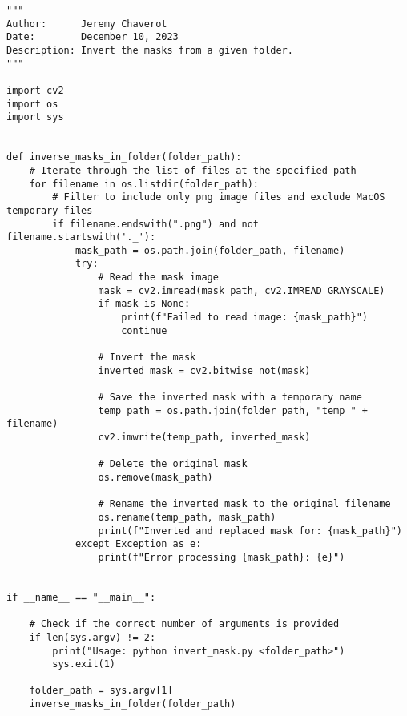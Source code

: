 \begin{lstlisting}[style=pythonstyle, label=lst:4, caption=Python script \texttt{invert\_mask.py} to invert the masks from a specified folder. We aim to have a black object set against a white background.]
"""
Author:      Jeremy Chaverot
Date:        December 10, 2023
Description: Invert the masks from a given folder.
"""

import cv2
import os
import sys


def inverse_masks_in_folder(folder_path):
	# Iterate through the list of files at the specified path
    for filename in os.listdir(folder_path):
    	# Filter to include only png image files and exclude MacOS temporary files
        if filename.endswith(".png") and not filename.startswith('._'):
            mask_path = os.path.join(folder_path, filename)
            try:
                # Read the mask image
                mask = cv2.imread(mask_path, cv2.IMREAD_GRAYSCALE)
                if mask is None:
                    print(f"Failed to read image: {mask_path}")
                    continue

                # Invert the mask
                inverted_mask = cv2.bitwise_not(mask)

                # Save the inverted mask with a temporary name
                temp_path = os.path.join(folder_path, "temp_" + filename)
                cv2.imwrite(temp_path, inverted_mask)

                # Delete the original mask
                os.remove(mask_path)

                # Rename the inverted mask to the original filename
                os.rename(temp_path, mask_path)
                print(f"Inverted and replaced mask for: {mask_path}")
            except Exception as e:
                print(f"Error processing {mask_path}: {e}")


if __name__ == "__main__":

	# Check if the correct number of arguments is provided
    if len(sys.argv) != 2:
        print("Usage: python invert_mask.py <folder_path>")
        sys.exit(1)

    folder_path = sys.argv[1]
    inverse_masks_in_folder(folder_path)
\end{lstlisting}

\bigskip

